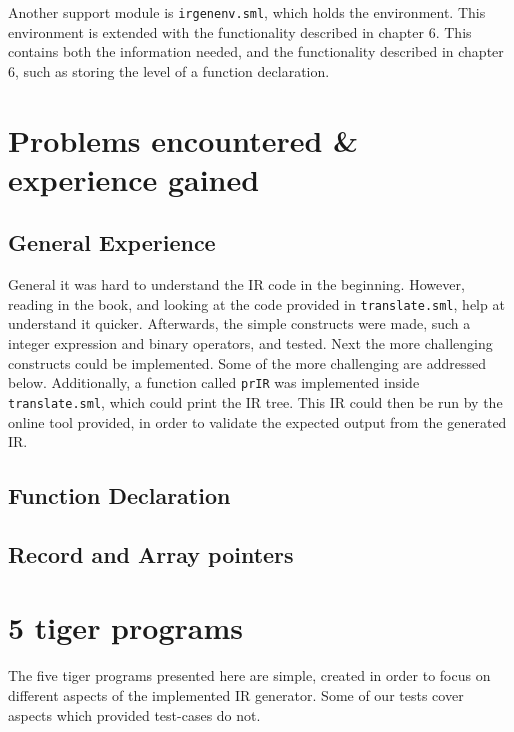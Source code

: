 \documentclass{article}
\begin{document}

Another support module is \texttt{irgenenv.sml}, which holds the environment. This environment is extended with the functionality described in chapter 6. This contains both the information needed, and the functionality described in chapter 6, such as storing the level of a function declaration.

\section{Problems encountered \& experience gained}

\subsection{General Experience}
General it was hard to understand the IR code in the beginning. However, reading in the book, and looking at the code provided in \texttt{translate.sml}, help at understand it quicker. Afterwards, the simple constructs were made, such a integer expression and binary operators, and tested. Next the more challenging constructs could be implemented. Some of the more challenging are addressed below. Additionally, a function called \texttt{prIR} was implemented inside \texttt{translate.sml}, which could print the IR tree. This IR could then be run by the online tool provided, in order to validate the expected output from the generated IR. 


\subsection{Function Declaration}

\subsection{Record and Array pointers}

\section{5 tiger programs}

The five tiger programs presented here are simple, created in order to focus on different aspects of the implemented IR generator. Some of our tests cover aspects which provided test-cases do not.
\end{document}
